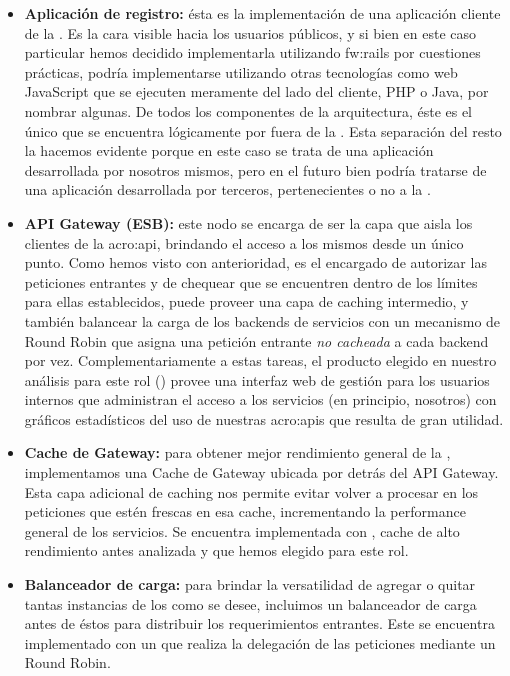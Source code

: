 \begin{itemize}
  \item \textbf{Aplicación de registro:} ésta es la implementación de una aplicación cliente de la {\cloud}. Es la cara visible hacia los usuarios públicos, y si bien en este caso particular hemos decidido implementarla utilizando \gls{fw:rails} por cuestiones prácticas, podría implementarse utilizando otras tecnologías como  web JavaScript que se ejecuten meramente del lado del cliente, PHP o Java, por nombrar algunas. De todos los componentes de la arquitectura, éste es el único que se encuentra lógicamente por fuera de la {\cloud}. Esta separación del resto la hacemos evidente porque en este caso se trata de una aplicación desarrollada por nosotros mismos, pero en el futuro bien podría tratarse de una aplicación desarrollada por terceros, pertenecientes o no a la {\unlp}.

  \item \textbf{API Gateway (ESB):} este nodo se encarga de ser la capa que aisla los clientes de la \gls{acro:api}, brindando el acceso a los mismos desde un único punto. Como hemos visto con anterioridad, es el encargado de autorizar las peticiones entrantes y de chequear que se encuentren dentro de los límites para ellas establecidos, puede proveer una capa de caching intermedio, y también balancear la carga de los backends de servicios con un mecanismo de Round Robin que asigna una petición entrante \textit{no cacheada} a cada backend por vez. Complementariamente a estas tareas, el producto elegido en nuestro análisis para este rol () provee una interfaz web de gestión para los usuarios internos que administran el acceso a los servicios (en principio, nosotros) con gráficos estadísticos del uso de nuestras \glspl{acro:api} que resulta de gran utilidad.

  \item \textbf{Cache de Gateway:} para obtener mejor rendimiento general de la {\cloud}, implementamos una Cache de Gateway ubicada por detrás del API Gateway. Esta capa adicional de caching nos permite evitar volver a procesar en los  peticiones que estén frescas en esa cache, incrementando la performance general de los servicios. Se encuentra implementada con , cache de alto rendimiento antes analizada y que hemos elegido para este rol.

  \item \textbf{Balanceador de carga:} para brindar la versatilidad de agregar o quitar tantas instancias de los  como se desee, incluimos un balanceador de carga antes de éstos para distribuir los requerimientos entrantes. Este se encuentra implementado con un  que realiza la delegación de las peticiones mediante un Round Robin.


\end{itemize}
